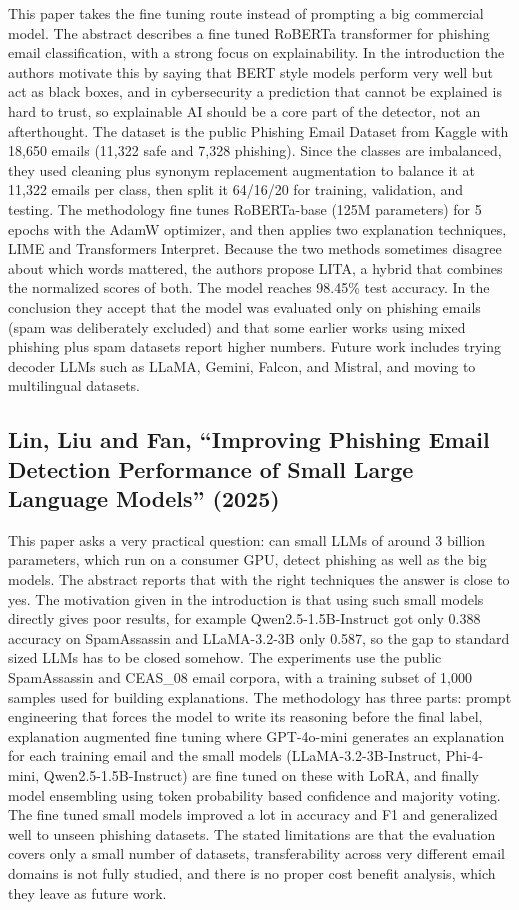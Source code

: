 \documentclass[10pt,a4paper]{article}
\begin{document}
This paper takes the fine tuning route instead of prompting a big commercial model. The abstract describes a fine tuned RoBERTa transformer for phishing email classification, with a strong focus on explainability. In the introduction the authors motivate this by saying that BERT style models perform very well but act as black boxes, and in cybersecurity a prediction that cannot be explained is hard to trust, so explainable AI should be a core part of the detector, not an afterthought. The dataset is the public Phishing Email Dataset from Kaggle with 18,650 emails (11,322 safe and 7,328 phishing). Since the classes are imbalanced, they used cleaning plus synonym replacement augmentation to balance it at 11,322 emails per class, then split it 64/16/20 for training, validation, and testing. The methodology fine tunes RoBERTa-base (125M parameters) for 5 epochs with the AdamW optimizer, and then applies two explanation techniques, LIME and Transformers Interpret. Because the two methods sometimes disagree about which words mattered, the authors propose LITA, a hybrid that combines the normalized scores of both. The model reaches 98.45\% test accuracy. In the conclusion they accept that the model was evaluated only on phishing emails (spam was deliberately excluded) and that some earlier works using mixed phishing plus spam datasets report higher numbers. Future work includes trying decoder LLMs such as LLaMA, Gemini, Falcon, and Mistral, and moving to multilingual datasets.

\subsection{Lin, Liu and Fan, ``Improving Phishing Email Detection Performance of Small Large Language Models'' (2025)}

This paper asks a very practical question: can small LLMs of around 3 billion parameters, which run on a consumer GPU, detect phishing as well as the big models. The abstract reports that with the right techniques the answer is close to yes. The motivation given in the introduction is that using such small models directly gives poor results, for example Qwen2.5-1.5B-Instruct got only 0.388 accuracy on SpamAssassin and LLaMA-3.2-3B only 0.587, so the gap to standard sized LLMs has to be closed somehow. The experiments use the public SpamAssassin and CEAS\_08 email corpora, with a training subset of 1,000 samples used for building explanations. The methodology has three parts: prompt engineering that forces the model to write its reasoning before the final label, explanation augmented fine tuning where GPT-4o-mini generates an explanation for each training email and the small models (LLaMA-3.2-3B-Instruct, Phi-4-mini, Qwen2.5-1.5B-Instruct) are fine tuned on these with LoRA, and finally model ensembling using token probability based confidence and majority voting. The fine tuned small models improved a lot in accuracy and F1 and generalized well to unseen phishing datasets. The stated limitations are that the evaluation covers only a small number of datasets, transferability across very different email domains is not fully studied, and there is no proper cost benefit analysis, which they leave as future work.
\end{document}

